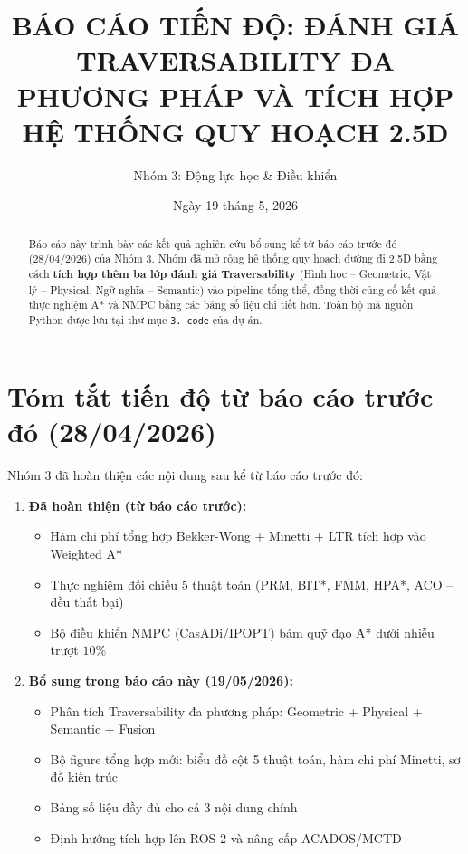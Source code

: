 \documentclass[12pt, a4paper]{article}
\title{\textbf{BÁO CÁO TIẾN ĐỘ: ĐÁNH GIÁ TRAVERSABILITY ĐA PHƯƠNG PHÁP VÀ TÍCH HỢP HỆ THỐNG QUY HOẠCH 2.5D}}
\author{Nhóm 3: Động lực học \& Điều khiển}
\date{Ngày 19 tháng 5, 2026}
\begin{document}
\maketitle

\begin{abstract}
Báo cáo này trình bày các kết quả nghiên cứu bổ sung kể từ báo cáo trước đó (28/04/2026) của Nhóm 3. Nhóm đã mở rộng hệ thống quy hoạch đường đi 2.5D bằng cách \textbf{tích hợp thêm ba lớp đánh giá Traversability} (Hình học -- Geometric, Vật lý -- Physical, Ngữ nghĩa -- Semantic) vào pipeline tổng thể, đồng thời củng cố kết quả thực nghiệm A* và NMPC bằng các bảng số liệu chi tiết hơn. Toàn bộ mã nguồn Python được lưu tại thư mục \texttt{3. code} của dự án.
\end{abstract}

\section{Tóm tắt tiến độ từ báo cáo trước đó (28/04/2026)}

Nhóm 3 đã hoàn thiện các nội dung sau kể từ báo cáo trước đó:

\begin{enumerate}
    \item \textbf{Đã hoàn thiện (từ báo cáo trước):}
    \begin{itemize}
        \item Hàm chi phí tổng hợp Bekker-Wong + Minetti + LTR tích hợp vào Weighted A*
        \item Thực nghiệm đối chiếu 5 thuật toán (PRM, BIT*, FMM, HPA*, ACO -- đều thất bại)
        \item Bộ điều khiển NMPC (CasADi/IPOPT) bám quỹ đạo A* dưới nhiễu trượt $10\%$
    \end{itemize}
    \item \textbf{Bổ sung trong báo cáo này (19/05/2026):}
    \begin{itemize}
        \item Phân tích Traversability đa phương pháp: Geometric + Physical + Semantic + Fusion
        \item Bộ figure tổng hợp mới: biểu đồ cột 5 thuật toán, hàm chi phí Minetti, sơ đồ kiến trúc
        \item Bảng số liệu đầy đủ cho cả 3 nội dung chính
        \item Định hướng tích hợp lên ROS 2 và nâng cấp ACADOS/MCTD
    \end{itemize}
\end{enumerate}
\end{document}
